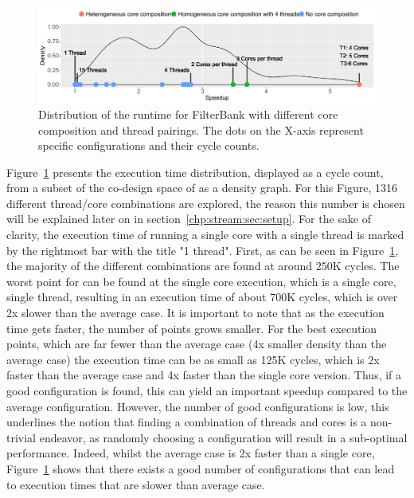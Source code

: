\begin{figure}[t]
    \centering
    \includegraphics[width=1\textwidth]{streamit-paper/graphics/filterbank_motivation_4.pdf}
    \caption{Distribution of the runtime for FilterBank with different core composition and thread pairings. The dots on the X-axis represent specific configurations and their cycle counts.}
     \label{fig:threadcoremotiv}
\end{figure}

Figure~\ref{fig:threadcoremotiv} presents the execution time distribution, displayed as a cycle count, from a subset of the co-design space of  as a density graph.
For this Figure, 1316 different thread/core combinations are explored, the reason this number is chosen will be explained later on in section~\ref{chp:stream:sec:setup}.
For the sake of clarity, the execution time of running a single core with a single thread is marked by the rightmost bar with the title "1 thread".
First, as can be seen in Figure~\ref{fig:threadcoremotiv}, the majority of the different combinations are found at around 250K cycles.
The worst point for  can be found at the single core execution, which is a single core, single thread, resulting in an execution time of about 700K cycles, which is over 2x slower than the average case.
It is important to note that as the execution time gets faster, the number of points grows smaller.
For the best execution points, which are far fewer than the average case (4x smaller density than the average case) the execution time can be as small as 125K cycles, which is 2x faster than the average case and 4x faster than the single core version.
Thus, if a good configuration is found, this can yield an important speedup compared to the average configuration.
However, the number of good configurations is low, this underlines the notion that finding a combination of threads and cores is a non-trivial endeavor, as randomly choosing a configuration will result in a sub-optimal performance.
Indeed, whilst the average case is 2x faster than a single core, Figure~\ref{fig:threadcoremotiv} shows that there exists a good number of configurations that can lead to execution times that are slower than average case.


